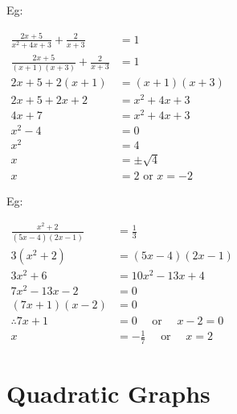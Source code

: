 \documentclass[twocolumn]{article}
\begin{document}
\bigskip

\bigskip 

\bigskip 

\bigskip 

\bigskip 

\noindent
Eg:

\noindent
$\begin{aligned}  \frac{2 x+5}{x^2+4x+3}+\frac{2}{x+3} & =1 \\ \frac{2 x+5}{(x+1)(x+3)}+\frac{2}{x+3} & =1 \\ 2 x+5+2(x+1) & =(x+1)(x+3) \\ 2 x+5+2 x+2 & =x^2+4 x+3 \\ 4 x+7 & =x^2+4 x+3 \\ x^2-4 & =0 \\ x^2 & =4 \\ x & = \pm \sqrt{4} \\ x & =2 \text { or } x=-2\end{aligned}$

\bigskip

\noindent
Eg:

\noindent
$\begin{aligned} \frac{x^2+2}{(5 x-4)(2 x-1)} & =\frac{1}{3} \\ 3\left(x^2+2\right) & =(5 x-4)(2 x-1) \\ 3 x^2+6 & =10 x^2-13 x+4 \\ 7 x^2-13 x-2 & =0 \\ (7 x+1)(x-2) & =0 \\ \therefore 7 x+1 & =0 \quad \text { or } \quad x-2=0 \\ x & =-\frac{1}{7} \quad \text { or } \quad x=2\end{aligned}$

\section*{Quadratic Graphs}
\end{document}
